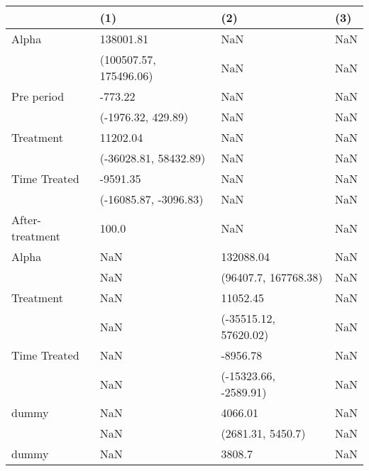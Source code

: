 \begin{tabular}{llll}
\toprule
{} &                     (1) &                    (2) &                   (3) \\
\midrule
Alpha           &               138001.81 &                    NaN &                   NaN \\
                &  (100507.57, 175496.06) &                    NaN &                   NaN \\
Pre period      &                 -773.22 &                    NaN &                   NaN \\
                &      (-1976.32, 429.89) &                    NaN &                   NaN \\
Treatment       &                11202.04 &                    NaN &                   NaN \\
                &   (-36028.81, 58432.89) &                    NaN &                   NaN \\
Time Treated    &                -9591.35 &                    NaN &                   NaN \\
                &   (-16085.87, -3096.83) &                    NaN &                   NaN \\
After-treatment &                   100.0 &                    NaN &                   NaN \\
Alpha           &                     NaN &              132088.04 &                   NaN \\
                &                     NaN &   (96407.7, 167768.38) &                   NaN \\
Treatment       &                     NaN &               11052.45 &                   NaN \\
                &                     NaN &  (-35515.12, 57620.02) &                   NaN \\
Time Treated    &                     NaN &               -8956.78 &                   NaN \\
                &                     NaN &  (-15323.66, -2589.91) &                   NaN \\
dummy           &                     NaN &                4066.01 &                   NaN \\
                &                     NaN &      (2681.31, 5450.7) &                   NaN \\
dummy           &                     NaN &                 3808.7 &                   NaN \\

\end{tabular}
